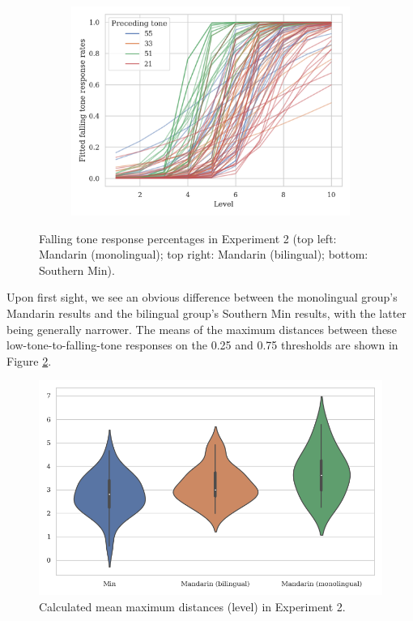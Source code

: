 \documentclass[12pt]{report}
\begin{document}
\begin{CJK}{UTF8}{bsmi}
\begin{figure}[hbt!]
\begin{subfigure}[b]{.45\textwidth}
\includegraphics[width=\textwidth]{Figures/E2/Min_E2_raw.png}
\end{subfigure}
\caption{Falling tone response percentages in Experiment 2 (top left: Mandarin (monolingual); top right: Mandarin (bilingual); bottom: Southern Min).}
\label{Figure:E2Raw}
\end{figure}

Upon first sight, we see an obvious difference between the monolingual group's Mandarin results and the bilingual group's Southern Min results, with the latter being generally narrower. The means of the maximum distances between these low-tone-to-falling-tone responses on the 0.25 and 0.75 thresholds are shown in Figure \ref{Figure:DistBoxPlot}.

\begin{figure}[hbt!]
\centering
\includegraphics[width=\textwidth, trim={0 .5cm 0 0}]{Figures/E2/Result.png}
\caption{Calculated mean maximum distances (level) in Experiment 2.}
\label{Figure:DistBoxPlot}
\end{figure}


\end{CJK}
\end{document}
